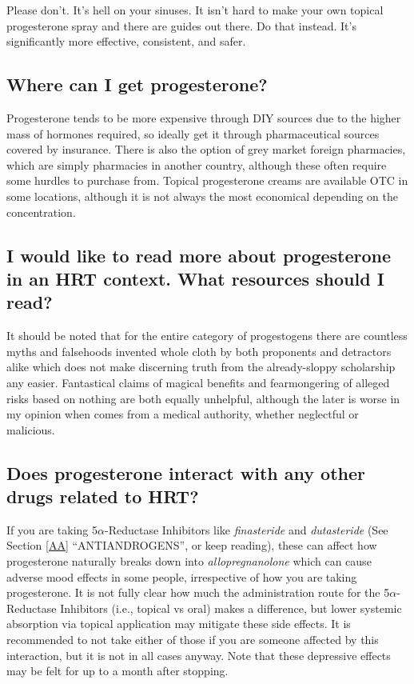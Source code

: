 \documentclass{article}
\begin{document}
Please don’t. It’s hell on your sinuses. It isn’t hard to make your own topical progesterone spray and there are guides out there. Do that instead. It’s significantly more effective, consistent, and safer.

\subsection{Where can I get progesterone?}

Progesterone tends to be more expensive through DIY sources due to the higher mass of hormones required, so ideally get it through pharmaceutical sources covered by insurance. There is also the option of grey market foreign pharmacies, which are simply pharmacies in another country, although these often require some hurdles to purchase from. Topical progesterone creams are available OTC in some locations, although it is not always the most economical depending on the concentration.

\subsection{I would like to read more about progesterone in an HRT context. What resources should I read?}\label{8-17}


It should be noted that for the entire category of progestogens there are countless myths and falsehoods invented whole cloth by both proponents and detractors alike which does not make discerning truth from the already-sloppy scholarship any easier. Fantastical claims of magical benefits and fearmongering of alleged risks based on nothing are both equally unhelpful, although the later is worse in my opinion when comes from a medical authority, whether neglectful or malicious.

\subsection{Does progesterone interact with any other drugs related to HRT?}\label{8-18}

If you are taking 5$\alpha$-Reductase Inhibitors like \textit{finasteride} and \textit{dutasteride} (See Section \ref{AA} “ANTIANDROGENS”, or keep reading), these can affect how progesterone naturally breaks down into \textit{allopregnanolone} which can cause adverse mood effects in some people, irrespective of how you are taking progesterone. It is not fully clear how much the administration route for the 5$\alpha$-Reductase Inhibitors (i.e., topical vs oral) makes a difference, but lower systemic absorption via topical application may mitigate these side effects. It is recommended to not take either of those if you are someone affected by this interaction, but it is not in all cases anyway. Note that these depressive effects may be felt for up to a month after stopping. 
 
\end{document}
